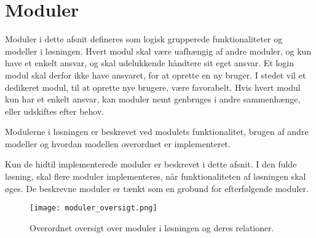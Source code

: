 \section{Moduler}
\label{sec:moduler}

Moduler i dette afsnit defineres som logisk grupperede funktionaliteter og modeller i løsningen. Hvert modul skal være uafhængig af andre moduler, og kun have et enkelt ansvar, og skal udelukkende håndtere sit eget ansvar. Et login modul skal derfor ikke have ansvaret, for at oprette en ny bruger. I stedet vil et dedikeret modul, til at oprette nye brugere, være favorabelt. Hvis hvert modul kun har et enkelt ansvar, kan moduler nemt genbruges i andre sammenhænge, eller udskiftes efter behov.

Modulerne i løsningen er beskrevet ved modulets funktionalitet, brugen af andre modeller og hvordan modellen overordnet er implementeret.

Kun de hidtil implementerede moduler er beskrevet i dette afsnit. I den fulde løsning, skal flere moduler implementeres, når funktionaliteten af løsningen skal øges. De beskrevne moduler er tænkt som en grobund for efterfølgende moduler.

\begin{figure}
  \centering
  \texttt{[image: moduler\_oversigt.png]}
  \caption{Overordnet oversigt over moduler i løsningen og deres relationer.}
\end{figure}









